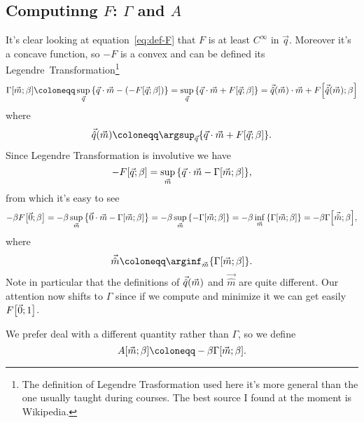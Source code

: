 
\subsection[Computing F: \textGamma and A]{Computinng \(F\): \(\Gamma\) and \(A\)}
It's clear looking at equation~\eqref{eq:def-F} that \(F\) is at least \(C^\infty\)
in \(\vec{q}\). Moreover it's a concave function, so \(-F\) is a convex and can be
defined its Legendre~Transformation\footnote{The definition of Legendre Trasformation
  used here it's more general than the one usually taught during courses. The best
  source I found at the moment is Wikipedia.}
\begin{equation}
  \Gam{\vec{m}}{\beta} \coloneqq \sup_{\vec{q}}{\left\{\vec{q}\cdot\vec{m}
                            - \left(-\FEn{\vec{q}}{\beta}\right)\right\}}
                       = \sup_{\vec{q}}{\left\{\vec{q}\cdot\vec{m}
                            + \FEn{\vec{q}}{\beta}\right\}}
                       = \qhat{\vec{m}}\cdot\vec{m} + \FEn{\qhat{\vec{m}}}{\beta}
\end{equation}
where
\[
  \qhat{\vec{m}} \coloneqq
  \argsup_{\vec{q}}{\left\{\vec{q}\cdot\vec{m} + \FEn{\vec{q}}{\beta}\right\}}.
\]
Since Legendre Transformation is involutive we have
\[
  -F{\left[\vec{q};\beta\right]} = \sup_{\vec{m}}{\left\{\vec{q}\cdot\vec{m} - \Gamma{\left[\vec{m};\beta\right]}\right\}},
\]
from which it's easy to see
\begin{equation*}
  -\beta F{\left[\vec{0};\beta\right]} = -\beta \sup_{\vec{m}}{\left\{\vec{0}\cdot\vec{m} -
                                                             \Gamma{\left[\vec{m};\beta\right]}\right\}}
                              = -\beta \sup_{\vec{m}}{\left\{-\Gamma{\left[\vec{m};\beta\right]}\right\}}
                              = -\beta \inf_{\vec{m}}{\left\{\Gamma{\left[\vec{m};\beta\right]}\right\}}
                              = -\beta \Gamma{\left[\vec{\hat{m}};\beta\right]},
\end{equation*}
where 
\[
  \vec{\hat{m}} \coloneqq
  \arginf_{\vec{m}}{\left\{\Gam{\vec{m}}{\beta}\right\}}.
\]
Note in particular that the definitions of \(\vec{\hat{q}}{(\vec{m})}\) and \(\vec{\hat{m}}\) are quite
different. Our attention now shifts to \(\Gamma\) since if we compute and minimize it we
can get easily \(F{\left[\vec{0};1\right]}\).

We prefer deal with a different quantity rather than \(\Gamma\), so we define
\[
  A{\left[\vec{m};\beta\right]} \coloneqq -\beta \Gam{\vec{m}}{\beta}.
\]

